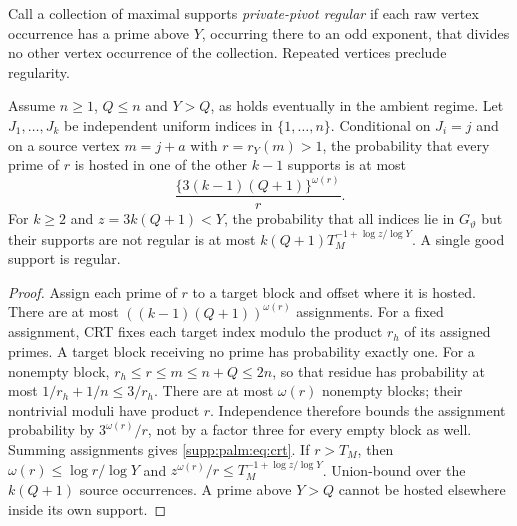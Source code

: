 Call a collection of maximal supports \emph{private-pivot regular} if each raw vertex occurrence has a prime above $Y$, occurring there to an odd exponent, that divides no other vertex occurrence of the collection. Repeated vertices preclude regularity.
\begin{lemma}\label{supp:palm:lem:crt}
Assume $n\ge1$, $Q\le n$ and $Y>Q$, as holds eventually in the ambient regime.
Let $J_1,\ldots,J_k$ be independent uniform indices in $\{1,\ldots,n\}$. Conditional on $J_i=j$ and on a source vertex $m=j+a$ with $r=r_Y(m)>1$, the probability that every prime of $r$ is hosted in one of the other $k-1$ supports is at most
\begin{equation}\label{supp:palm:eq:crt}
 \frac{\{3(k-1)(Q+1)\}^{\omega(r)}}r.
\end{equation}
For $k\ge2$ and $z=3k(Q+1)<Y$, the probability that all indices lie in $G_\vartheta$ but their supports are not regular is at most
$k(Q+1)T_M^{-1+\log z/\log Y}$. A single good support is regular.
\end{lemma}
\begin{proof}
Assign each prime of $r$ to a target block and offset where it is hosted. There are at most $((k-1)(Q+1))^{\omega(r)}$ assignments. For a fixed assignment, CRT fixes each target index modulo the product
$r_h$ of its assigned primes. A target block receiving no prime has
probability exactly one. For a nonempty block,
$r_h\le r\le m\le n+Q\le2n$, so that residue has probability at most
$1/r_h+1/n\le3/r_h$. There are at most $\omega(r)$ nonempty blocks;
their nontrivial moduli have product $r$. Independence therefore bounds
the assignment probability by $3^{\omega(r)}/r$, not by a factor
three for every empty block as well. Summing assignments gives
\eqref{supp:palm:eq:crt}.
If $r>T_M$, then $\omega(r)\le\log r/\log Y$ and
$z^{\omega(r)}/r\le T_M^{-1+\log z/\log Y}$.
Union-bound over the $k(Q+1)$ source occurrences. A prime above $Y>Q$ cannot be hosted elsewhere inside its own support.
\end{proof}

